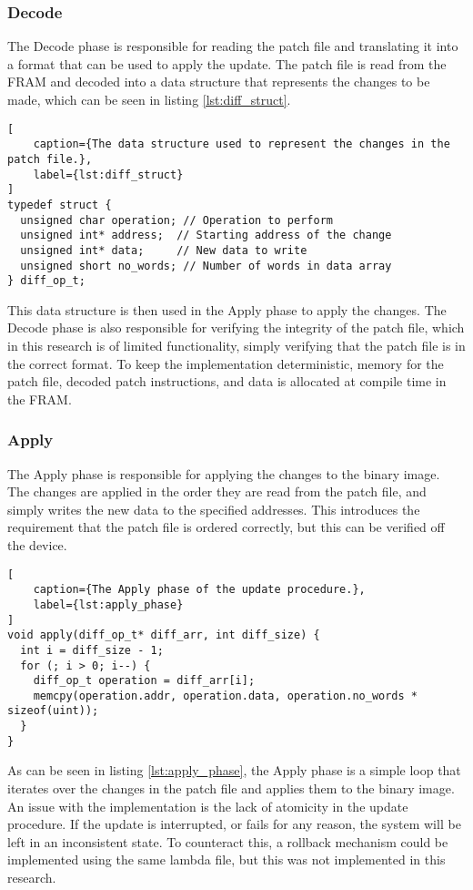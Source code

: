\subsubsection*{Decode}
The Decode phase is responsible for reading the patch file and translating it into a format that can be used to apply the update. The patch file is read from the FRAM and decoded into a data structure that represents the changes to be made, which can be seen in listing \ref{lst:diff_struct}. 
\begin{lstlisting}[
    caption={The data structure used to represent the changes in the patch file.},
    label={lst:diff_struct}
]
typedef struct {
  unsigned char operation; // Operation to perform
  unsigned int* address;  // Starting address of the change
  unsigned int* data;     // New data to write
  unsigned short no_words; // Number of words in data array
} diff_op_t;
\end{lstlisting}
This data structure is then used in the Apply phase to apply the changes. The Decode phase is also responsible for verifying the integrity of the patch file, which in this research is of limited functionality, simply verifying that the patch file is in the correct format. To keep the implementation deterministic, memory for the patch file, decoded patch instructions, and data is allocated at compile time in the FRAM.

\subsubsection*{Apply}
The Apply phase is responsible for applying the changes to the binary image. The changes are applied in the order they are read from the patch file, and simply writes the new data to the specified addresses. This introduces the requirement that the patch file is ordered correctly, but this can be verified off the device. 

\begin{lstlisting}[
    caption={The Apply phase of the update procedure.},
    label={lst:apply_phase}
]
void apply(diff_op_t* diff_arr, int diff_size) {
  int i = diff_size - 1;
  for (; i > 0; i--) {
    diff_op_t operation = diff_arr[i];
    memcpy(operation.addr, operation.data, operation.no_words * sizeof(uint));
  }
}
\end{lstlisting}

As can be seen in listing \ref{lst:apply_phase}, the Apply phase is a simple loop that iterates over the changes in the patch file and applies them to the binary image. An issue with the implementation is the lack of atomicity in the update procedure. If the update is interrupted, or fails for any reason, the system will be left in an inconsistent state. To counteract this, a rollback mechanism could be implemented using the same lambda file, but this was not implemented in this research. 

